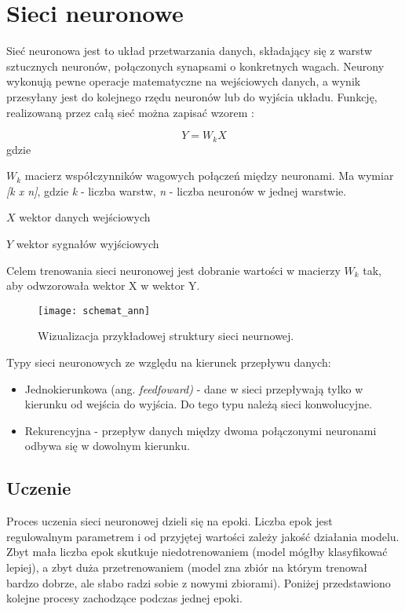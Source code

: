 \section{Sieci neuronowe}

Sieć neuronowa jest to układ przetwarzania danych, składający się z warstw sztucznych neuronów, połączonych synapsami o konkretnych wagach. Neurony wykonują pewne operacje matematyczne na wejściowych danych, a wynik przesyłany jest do kolejnego rzędu neuronów lub do wyjścia układu. Funkcję, realizowaną przez całą sieć można zapisać wzorem \cite{tadeusiewicz_sn}:

\begin{equation}
Y = W_k X
\end{equation}
gdzie
\begin{eqwhere}[2cm]
	\item[$W_k$] macierz współczynników wagowych połączeń między neuronami. Ma wymiar \textit{[k x n]}, gdzie \textit{k} - liczba warstw, \textit{n} - liczba neuronów w jednej warstwie.
	\item[$X$] wektor danych wejściowych
	\item[$Y$] wektor sygnałów wyjściowych
\end{eqwhere}

Celem trenowania sieci neuronowej jest dobranie wartości w macierzy \textit{$W_k$} tak, aby odwzorowała wektor X w wektor Y. 

\begin{figure}[h]
	\centering
	\centering
		\texttt{[image: schemat\_ann]}	
	\caption{Wizualizacja przykładowej struktury sieci neurnowej.}
\end{figure}

Typy sieci neuronowych ze względu na kierunek przepływu danych:
\begin{itemize}
\item{Jednokierunkowa (ang. \textit{feedfoward)} - dane w sieci przepływają tylko w kierunku od wejścia do wyjścia. Do tego typu należą sieci konwolucyjne.}
\item{Rekurencyjna - przepływ danych między dwoma połączonymi neuronami odbywa się w dowolnym kierunku.}
\end{itemize}

\subsection{Uczenie}
Proces uczenia sieci neuronowej dzieli się na epoki. Liczba epok jest regulowalnym parametrem i od przyjętej wartości zależy jakość działania modelu. Zbyt mała liczba epok skutkuje niedotrenowaniem (model mógłby klasyfikować lepiej), a zbyt duża przetrenowaniem (model zna zbiór na którym trenował bardzo dobrze, ale słabo radzi sobie z nowymi zbiorami). Poniżej przedstawiono kolejne procesy zachodzące podczas jednej epoki.

